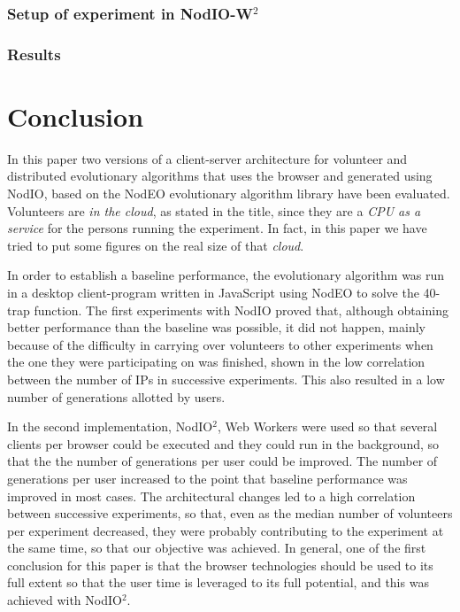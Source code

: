 \documentclass[journal,onecolumn]{IEEEtran}
\begin{document}
\subsubsection{Setup of experiment in NodIO-W$^2$ }

\subsubsection{Results}

\section{Conclusion}
\label{sec:conclusion}

In this paper two versions of a client-server architecture for volunteer and distributed
evolutionary algorithms that uses the browser and generated using {\sf
  NodIO}, based on the {\sf NodEO} evolutionary algorithm library have been
evaluated. Volunteers are {\em in the cloud}, as stated in the title,
since they are a {\em CPU as a service} for the persons running the
experiment. In fact, in this paper we have tried to put some figures
on the real size of that {\em cloud}.

In order to establish a baseline performance, the evolutionary
algorithm was run in a desktop client-program written in JavaScript
using NodEO to solve the 40-trap function. The first experiments with
{\sf NodIO} proved that, although obtaining better performance than the
baseline was possible, it did not happen, mainly because of the
difficulty in carrying over volunteers to other experiments when the
one they were participating on was finished, shown in the low
correlation between the number of IPs in successive experiments. This
also resulted in a low number of generations allotted by users. 

In the second implementation, {\sf NodIO$^2$}, Web Workers
were used so that several clients per browser could be executed and
they could run in the background, so that the the number of
generations per user could be improved. The number of generations per
user increased to the point that baseline performance was improved in
most cases. The architectural changes led to a high correlation
between successive experiments, so that, even as the median number of
volunteers per experiment decreased, they were probably contributing
to the experiment at the same time, so that our objective was
achieved. In general, one of the first conclusion for this paper is
that the browser technologies should be used to its full extent so
that the user time is leveraged to its full potential, and this was
achieved with {\sf NodIO$^2$}.
\end{document}
